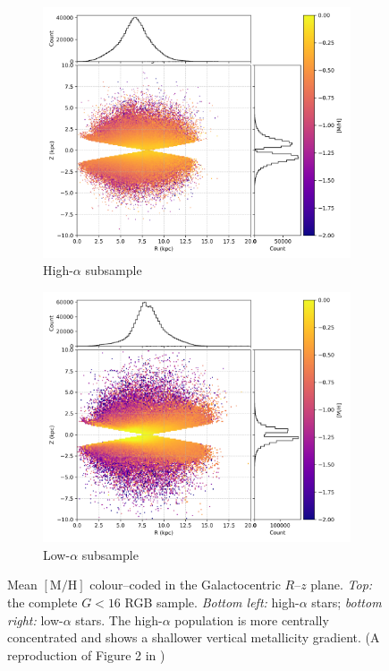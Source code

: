 \documentclass[a4paper,12pt]{article}
\begin{document}
\begin{figure}[H]
  \begin{subfigure}{0.45\textwidth}
    \centering
    \includegraphics[width=\textwidth]{../figures/vis_rz_metallicity_high_alpha.png}
    \caption{High-$\alpha$ subsample}
    \label{fig:rz_highalpha}
  \end{subfigure}\hfill
  \begin{subfigure}{0.45\textwidth}
    \centering
    \includegraphics[width=\textwidth]{../figures/vis_rz_metallicity_low_alpha.png}
    \caption{Low-$\alpha$ subsample}
    \label{fig:rz_lowalpha}
  \end{subfigure}

  \caption{Mean $[\mathrm{M/H}]$ colour–coded in the
           Galactocentric $R$–$z$ plane.  
           \textit{Top:} the complete $G<16$ RGB sample.
           \textit{Bottom left:} high-$\alpha$ stars; \textit{bottom right:} low-$\alpha$ stars.
           The high-$\alpha$ population is more centrally concentrated and
           shows a shallower vertical metallicity gradient. (A reproduction of
           Figure 2 in \citet{Vis2024}) }
  \label{fig:rz_metallicity}
\end{figure}
\end{document}
